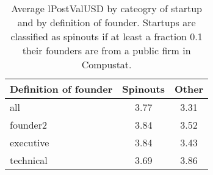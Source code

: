\begin{table}[!htb]
\centering
\begingroup\small
\begin{tabular}{p{1.5cm}cc}
  \toprule
Definition of founder & Spinouts & Other \\ 
  \midrule
all & 3.77 & 3.31 \\ 
  founder2 & 3.84 & 3.52 \\ 
  executive & 3.84 & 3.43 \\ 
  technical & 3.69 & 3.86 \\ 
   \bottomrule
\end{tabular}
\endgroup
\caption{Average lPostValUSD by cateogry of startup and by definition of founder. Startups are classified as spinouts if at least a fraction 0.1 their founders are from a public firm in Compustat.} 
\label{table:raw_comparison_lPostValUSD}
\end{table}
